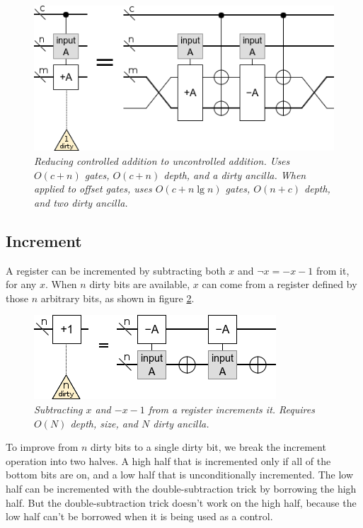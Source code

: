 \documentclass[twocolumn]{article}
\begin{document}
\begin{figure}
  \centering
  \includegraphics[width=\linewidth]{assets/controlled-addition.png}
  \caption{\em
  	Reducing controlled addition to uncontrolled addition.
  	Uses $O(c + n)$ gates, $O(c + n)$ depth, and a dirty ancilla.
  	When applied to offset gates, uses $O(c + n \lg n)$ gates, $O(n + c)$ depth, and two dirty ancilla.
  }
  \label{fig:controlled-addition}
\end{figure}


\subsection{Increment}

A register can be incremented by subtracting both $x$ and $\neg x = -x-1$ from it, for any $x$.
When $n$ dirty bits are available, $x$ can come from a register defined by those $n$ arbitrary bits, as shown in figure \ref{fig:increment-many-dirty}.

\begin{figure}
  \centering
  \includegraphics[width=\linewidth]{assets/increment-many-dirty.png}
  \caption{\em Subtracting $x$ and $-x-1$ from a register increments it. Requires $O(N)$ depth, size, and $N$ dirty ancilla.}
  \label{fig:increment-many-dirty}
\end{figure}

To improve from $n$ dirty bits to a single dirty bit, we break the increment operation into two halves.
A high half that is incremented only if all of the bottom bits are on, and a low half that is unconditionally incremented.
The low half can be incremented with the double-subtraction trick by borrowing the high half.
But the double-subtraction trick doesn't work on the high half, because the low half can't be borrowed when it is being used as a control.
\end{document}
